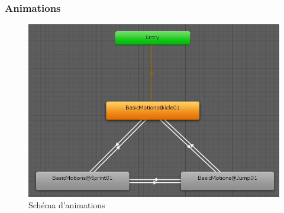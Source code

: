 \documentclass{article}
\begin{document}
\subsubsection{Animations}
\label{Animations}

\begin{figure}[h]
	\includegraphics[width=1\textwidth]{anim.jpg}
	\caption{Schéma d'animations}
\end{figure}



\newpage
\end{document}
